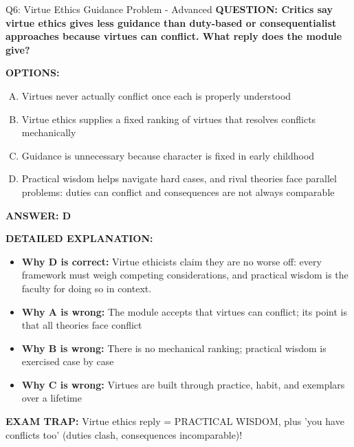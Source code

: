 \documentclass[8pt]{beamer}
\begin{document}
\begin{frame}[shrink=6]{Q6: Virtue Ethics Guidance Problem - Advanced}
\fontsize{6.5}{7.5}\selectfont
\textbf{QUESTION: Critics say virtue ethics gives less guidance than duty-based or consequentialist approaches because virtues can conflict. What reply does the module give?}

\vspace{0.1cm}
\textbf{OPTIONS:}
\begin{enumerate}[A.]
\item Virtues never actually conflict once each is properly understood
\item Virtue ethics supplies a fixed ranking of virtues that resolves conflicts mechanically
\item Guidance is unnecessary because character is fixed in early childhood
\item Practical wisdom helps navigate hard cases, and rival theories face parallel problems: duties can conflict and consequences are not always comparable
\end{enumerate}

\vspace{0.1cm}
\textcolor{myblue}{\textbf{ANSWER: D}}

\vspace{0.1cm}
\textbf{DETAILED EXPLANATION:}
\begin{itemize}
\item \textbf{Why D is correct:} Virtue ethicists claim they are no worse off: every framework must weigh competing considerations, and practical wisdom is the faculty for doing so in context.
\item \textbf{Why A is wrong:} The module accepts that virtues can conflict; its point is that all theories face conflict
\item \textbf{Why B is wrong:} There is no mechanical ranking; practical wisdom is exercised case by case
\item \textbf{Why C is wrong:} Virtues are built through practice, habit, and exemplars over a lifetime
\end{itemize}

\textcolor{myred}{\textbf{EXAM TRAP:}} Virtue ethics reply = PRACTICAL WISDOM, plus 'you have conflicts too' (duties clash, consequences incomparable)!
\end{frame}
\end{document}
